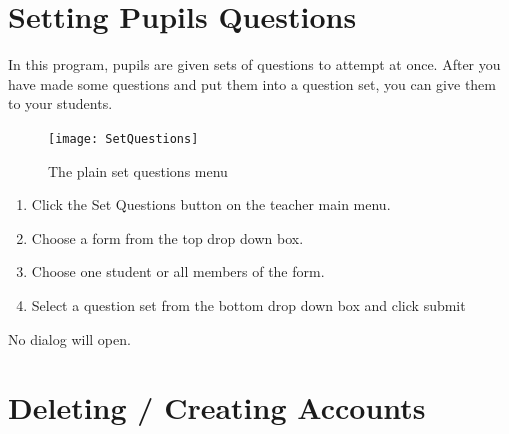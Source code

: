 \documentclass{report}
\begin{document}
\section{Setting Pupils Questions}
In this program, pupils are given sets of questions to attempt at once. After you have made some questions and put them into a question set, you can give them to your students.
\begin{figure}[h]
\centering
\texttt{[image: SetQuestions]}
\caption{The plain set questions menu}
\label{fig:plainsetquestions}
\end{figure}
\begin{enumerate}
\item Click the Set Questions button on the teacher main menu.
\item Choose a form from the top drop down box.
\item Choose one student or all members of the form.
\item Select a question set from the bottom drop down box and click submit
\end{enumerate}
No dialog will open.
\section{Deleting  / Creating Accounts}
\end{document}
